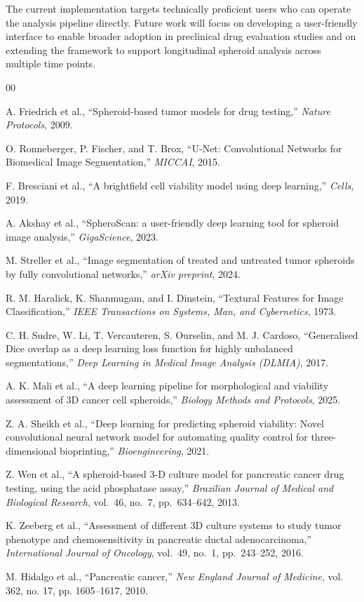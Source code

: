 \documentclass[sigconf, nonacm]{acmart}
\begin{document}
The current implementation targets technically proficient users who can operate the analysis pipeline directly. Future work will focus on developing a user-friendly interface to enable broader adoption in preclinical drug evaluation studies and on extending the framework to support longitudinal spheroid analysis across multiple time points.


\begin{thebibliography}{00}

A. Friedrich et al., ``Spheroid-based tumor models for drug testing,'' \emph{Nature Protocols}, 2009.

O. Ronneberger, P. Fischer, and T. Brox,
``U-Net: Convolutional Networks for Biomedical Image Segmentation,''
\emph{MICCAI}, 2015.

F. Bresciani et al., ``A brightfield cell viability model using deep learning,'' \emph{Cells}, 2019.


A. Akshay et al., ``SpheroScan: a user-friendly deep learning tool for spheroid image analysis,'' \emph{GigaScience}, 2023.


M. Streller et al., ``Image segmentation of treated and untreated tumor spheroids by fully convolutional networks,'' \emph{arXiv preprint}, 2024.


R. M. Haralick, K. Shanmugam, and I. Dinstein, ``Textural Features for Image Classification,''
\emph{IEEE Transactions on Systems, Man, and Cybernetics}, 1973.

C. H. Sudre, W. Li, T. Vercauteren, S. Ourselin, and M. J. Cardoso,
``Generalised Dice overlap as a deep learning loss function for highly unbalanced segmentations,''
\emph{Deep Learning in Medical Image Analysis (DLMIA)}, 2017.

A. K. Mali et al., ``A deep learning pipeline for morphological and viability assessment of 3D cancer cell spheroids,'' \emph{Biology Methods and Protocols}, 2025.

Z. A. Sheikh et al., ``Deep learning for predicting spheroid viability: Novel convolutional neural network model for automating quality control for three-dimensional bioprinting,'' \emph{Bioengineering}, 2021.

Z. Wen et al., ``A spheroid-based 3-D culture model for pancreatic cancer drug testing, using the acid phosphatase assay,'' \emph{Brazilian Journal of Medical and Biological Research}, vol.~46, no.~7, pp.~634--642, 2013.

K. Zeeberg et al., ``Assessment of different 3D culture systems to study tumor phenotype and chemosensitivity in pancreatic ductal adenocarcinoma,'' \emph{International Journal of Oncology}, vol.~49, no.~1, pp.~243--252, 2016.

M. Hidalgo et al., ``Pancreatic cancer,'' \emph{New England Journal of Medicine}, vol. 362, no. 17, pp. 1605--1617, 2010.

\end{thebibliography}
\end{document}
